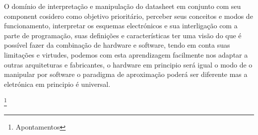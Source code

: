 \documentclass[titlepage, a4paper, 10pt, reqno, openany]{report}
\begin{document}
O dom\'{i}nio de interpreta\c{c}\~{a}o e manipula\c{c}\~{a}o do datasheet em conjunto com seu component cosidero como objetivo priorit\'{a}rio, perceber seus conceitos e modos de funcionamento, interpretar os esquemas electr\'{o}nicos e sua interliga\c{c}\~{a}o com a parte de programa\c{c}\~{a}o, suas defini\c{c}\~{o}es e caracter\'{i}sticas ter uma vis\~{a}o do que \'{e} poss\'{i}vel fazer da combina\c{c}\~{a}o de hardware e software, tendo em conta suas limita\c{c}\~{o}es e virtudes, podemos com esta aprendizagem facilmente nos adaptar a outras arquiteturas e fabricantes, o hardware em principio ser\'{a} igual o modo de o manipular por software o paradigma de aproxima\c{c}\~{a}o poder\'{a} ser diferente mas a eletr\'{o}nica em principio \'{e} universal.
\newpage

%
\cite{*}

%
%
\newpage
\footnote{Apontamentos}
%
	
\end{document}

